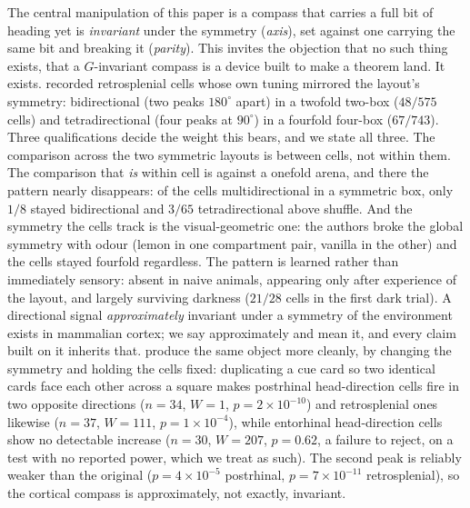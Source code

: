 \documentclass[9pt,lineno]{elife}
\begin{document}
The central manipulation of this paper is a compass that carries a full bit of heading yet is
\emph{invariant} under the symmetry (\textit{axis}), set against one carrying the same bit and breaking
it (\textit{parity}). This invites the objection that no such thing exists, that a $G$-invariant compass
is a device built to make a theorem land. It exists. \citet{zhang2022} recorded retrosplenial cells whose own
tuning mirrored the layout's symmetry: bidirectional (two peaks $180^\circ$ apart) in a twofold two-box
($48/575$ cells) and tetradirectional (four peaks at $90^\circ$) in a fourfold four-box ($67/743$).
Three qualifications decide the weight this bears, and we state all three. The comparison across the two
symmetric layouts is between cells, not within them. The comparison that \emph{is} within cell is
against a onefold arena, and there the pattern nearly disappears: of the cells multidirectional in a
symmetric box, only $1/8$ stayed bidirectional and $3/65$ tetradirectional above shuffle. And the
symmetry the cells track is the visual-geometric one: the authors broke the global symmetry with odour
(lemon in one compartment pair, vanilla in the other) and the cells stayed fourfold regardless. The
pattern is learned rather than immediately sensory: absent in naive animals, appearing only after
experience of the layout, and largely surviving darkness ($21/28$ cells in the first dark trial). A
directional signal \emph{approximately} invariant under a symmetry of the environment exists in
mammalian cortex; we say approximately and mean it, and every claim built on it inherits that.
\citet{lachance2024} produce the same object more cleanly, by changing the symmetry and holding the
cells fixed: duplicating a cue card so two identical cards face each other across a square makes
postrhinal head-direction cells fire in two opposite directions ($n = 34$, $W = 1$,
$p = 2\times10^{-10}$) and retrosplenial ones likewise ($n = 37$, $W = 111$, $p = 1\times10^{-4}$),
while entorhinal head-direction cells show no detectable increase ($n = 30$, $W = 207$, $p = 0.62$, a
failure to reject, on a test with no reported power, which we treat as such). The second peak is
reliably weaker than the original ($p = 4\times10^{-5}$ postrhinal, $p = 7\times10^{-11}$
retrosplenial), so the cortical compass is approximately, not exactly, invariant.
\end{document}
